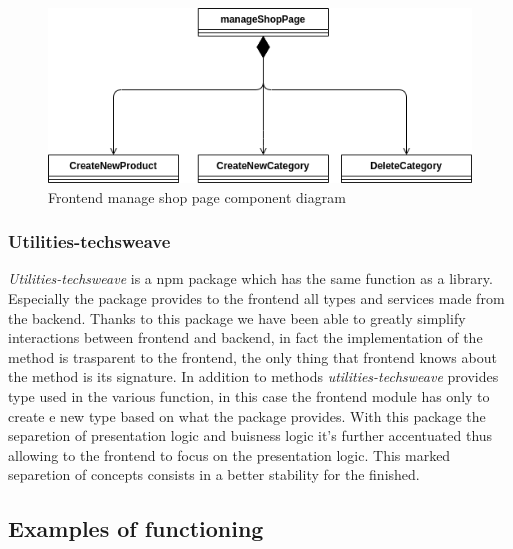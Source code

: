 \begin{figure}[!ht]
  \caption{ Frontend manage shop page component diagram}
  \vspace{10px}
  \includegraphics[scale=0.39]{../../../../Images/Diagrammi/maintainerManual/FE/manageShopDiagram.png}
  \centering
\end{figure}
\clearpage
\subsubsection{Utilities-techsweave}
\textit{Utilities-techsweave} is a npm package which has the same function as a library. Especially the package provides to the frontend all types and services made from the backend. Thanks to this package we have been able to greatly simplify interactions between frontend and backend, in fact the implementation of the method is trasparent to the frontend, the only thing that frontend knows about the method is its signature.
In addition to methods \textit{utilities-techsweave} provides type used in the various function, in this case the frontend module has only to create e new type based on what the package provides. With this package the separetion of presentation logic and buisness logic it's further accentuated thus allowing to the frontend to focus on the presentation logic. This marked separetion of concepts consists in a better stability for the finished.















\subsection{Examples of functioning}
